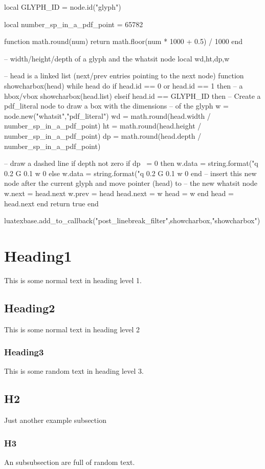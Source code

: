 \documentclass{article}
\begin{document}
\begin{luacode*}
local GLYPH_ID = node.id("glyph")

local number_sp_in_a_pdf_point = 65782

function math.round(num)
  return math.floor(num * 1000 + 0.5) / 1000
end

-- width/height/depth of a glyph and the whatsit node
local wd,ht,dp,w

-- head is a linked list (next/prev entries pointing to the next node)
function showcharbox(head)
  while head do
    if head.id == 0 or head.id == 1 then
      -- a hbox/vbox
      showcharbox(head.list)
    elseif head.id == GLYPH_ID then
      -- Create a pdf_literal node to draw a box with the dimensions
      -- of the glyph
      w = node.new("whatsit","pdf_literal")
      wd = math.round(head.width  / number_sp_in_a_pdf_point)
      ht = math.round(head.height / number_sp_in_a_pdf_point)
      dp = math.round(head.depth  / number_sp_in_a_pdf_point)

      -- draw a dashed line if depth not zero
      if dp ~= 0 then
        w.data = string.format("q 0.2 G 0.1 w 0 %
      else
        w.data = string.format("q 0.2 G 0.1 w 0 %
      end
      -- insert this new node after the current glyph and move pointer (head) to
      -- the new whatsit node
      w.next = head.next
      w.prev = head
      head.next = w
      head = w
    end
    head = head.next
  end
  return true
end

luatexbase.add_to_callback("post_linebreak_filter",showcharbox,"showcharbox")
\end{luacode*}

\section{Heading1}
This is some normal text in heading level 1.
\subsection{Heading2}
This is some normal text in heading level 2
\subsubsection{Heading3}
This is some random text in heading level 3. 
\subsection{H2}
Just another example subsection
\subsubsection{H3}
An subsubsection are full of random text. 
\end{document}
